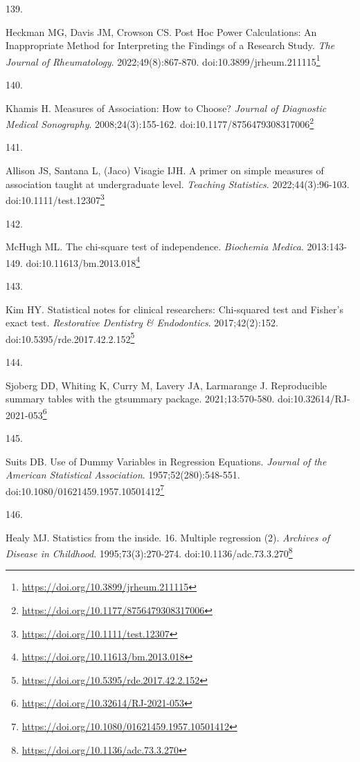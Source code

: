 \documentclass[
]{book}
\newlength{\cslhangindent}
\newlength{\csllabelwidth}
\newlength{\cslentryspacingunit} %
\newenvironment{CSLReferences}[2] %
 {%
  \setlength{\parindent}{0pt}
  \ifodd #1
  \let\oldpar\par
  \def\par{\hangindent=\cslhangindent\oldpar}
  \fi
  \setlength{\parskip}{#2\cslentryspacingunit}
 }%
 {}
\newcommand{\CSLLeftMargin}[1]{\parbox[t]{\csllabelwidth}{#1}}
\newcommand{\CSLRightInline}[1]{\parbox[t]{\linewidth - \csllabelwidth}{#1}\break}
\renewcommand{\href}[2]{#2\footnote{\url{#1}}}
\begin{document}
\begin{CSLReferences}{0}{0}
\leavevmode{}%
\CSLLeftMargin{139. }%
\CSLRightInline{Heckman MG, Davis JM, Crowson CS. Post Hoc Power Calculations: An Inappropriate Method for Interpreting the Findings of a Research Study. \emph{The Journal of Rheumatology}. 2022;49(8):867-870. doi:\href{https://doi.org/10.3899/jrheum.211115}{10.3899/jrheum.211115}}

\leavevmode{}%
\CSLLeftMargin{140. }%
\CSLRightInline{Khamis H. Measures of Association: How to Choose? \emph{Journal of Diagnostic Medical Sonography}. 2008;24(3):155-162. doi:\href{https://doi.org/10.1177/8756479308317006}{10.1177/8756479308317006}}

\leavevmode{}%
\CSLLeftMargin{141. }%
\CSLRightInline{Allison JS, Santana L, (Jaco) Visagie IJH. A primer on simple measures of association taught at undergraduate level. \emph{Teaching Statistics}. 2022;44(3):96-103. doi:\href{https://doi.org/10.1111/test.12307}{10.1111/test.12307}}

\leavevmode{}%
\CSLLeftMargin{142. }%
\CSLRightInline{McHugh ML. The chi-square test of independence. \emph{Biochemia Medica}. 2013:143-149. doi:\href{https://doi.org/10.11613/bm.2013.018}{10.11613/bm.2013.018}}

\leavevmode{}%
\CSLLeftMargin{143. }%
\CSLRightInline{Kim HY. Statistical notes for clinical researchers: Chi-squared test and Fisher's exact test. \emph{Restorative Dentistry \& Endodontics}. 2017;42(2):152. doi:\href{https://doi.org/10.5395/rde.2017.42.2.152}{10.5395/rde.2017.42.2.152}}

\leavevmode{}%
\CSLLeftMargin{144. }%
\CSLRightInline{Sjoberg DD, Whiting K, Curry M, Lavery JA, Larmarange J. Reproducible summary tables with the gtsummary package. 2021;13:570-580. doi:\href{https://doi.org/10.32614/RJ-2021-053}{10.32614/RJ-2021-053}}

\leavevmode{}%
\CSLLeftMargin{145. }%
\CSLRightInline{Suits DB. Use of Dummy Variables in Regression Equations. \emph{Journal of the American Statistical Association}. 1957;52(280):548-551. doi:\href{https://doi.org/10.1080/01621459.1957.10501412}{10.1080/01621459.1957.10501412}}

\leavevmode{}%
\CSLLeftMargin{146. }%
\CSLRightInline{Healy MJ. Statistics from the inside. 16. Multiple regression (2). \emph{Archives of Disease in Childhood}. 1995;73(3):270-274. doi:\href{https://doi.org/10.1136/adc.73.3.270}{10.1136/adc.73.3.270}}


\end{CSLReferences}
\end{document}
